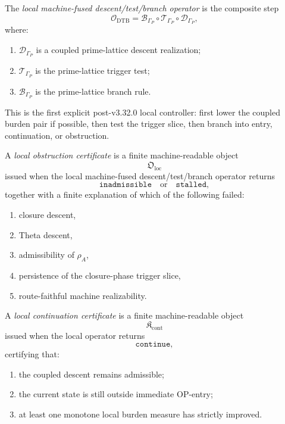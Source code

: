\begin{definition}
\label{def:local-machine-fused-descent-test-branch-operator}
The \emph{local machine-fused descent/test/branch operator} is the composite step
\[
\mathcal{O}_{\mathrm{DTB}}
=
\mathcal{B}_{\Gamma_P}
\circ
\mathcal{T}_{\Gamma_P}
\circ
\mathcal{D}_{\Gamma_P},
\]
where:
\begin{enumerate}
    \item $\mathcal{D}_{\Gamma_P}$ is a coupled prime-lattice descent realization;
    \item $\mathcal{T}_{\Gamma_P}$ is the prime-lattice trigger test;
    \item $\mathcal{B}_{\Gamma_P}$ is the prime-lattice branch rule.
\end{enumerate}
\end{definition}

\begin{remark}
\label{rem:operational-reading-local-operator}
This is the first explicit post-v3.32.0 local controller:
first lower the coupled burden pair if possible,
then test the trigger slice,
then branch into entry, continuation, or obstruction.
\end{remark}

\begin{definition}
\label{def:local-obstruction-certificate}
A \emph{local obstruction certificate} is a finite machine-readable object
\[
\mathfrak{O}_{\mathrm{loc}}
\]
issued when the local machine-fused descent/test/branch operator returns
\[
\mathtt{inadmissible}
\quad\text{or}\quad
\mathtt{stalled},
\]
together with a finite explanation of which of the following failed:
\begin{enumerate}
    \item closure descent,
    \item Theta descent,
    \item admissibility of $\rho_A$,
    \item persistence of the closure-phase trigger slice,
    \item route-faithful machine realizability.
\end{enumerate}
\end{definition}

\begin{definition}
\label{def:local-continuation-certificate}
A \emph{local continuation certificate} is a finite machine-readable object
\[
\mathfrak{K}_{\mathrm{cont}}
\]
issued when the local operator returns
\[
\mathtt{continue},
\]
certifying that:
\begin{enumerate}
    \item the coupled descent remains admissible;
    \item the current state is still outside immediate OP-entry;
    \item at least one monotone local burden measure has strictly improved.
\end{enumerate}
\end{definition}

